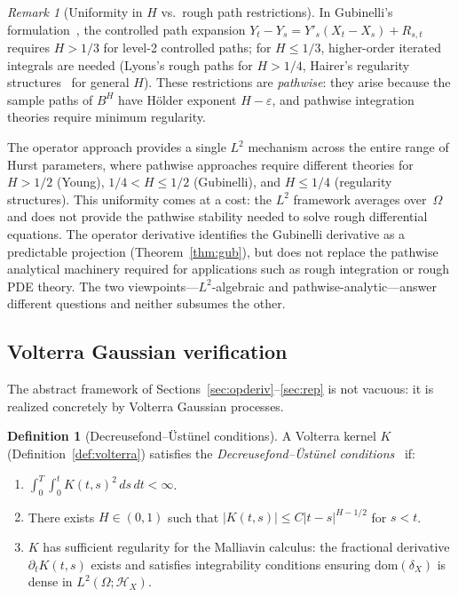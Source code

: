 \documentclass[11pt,a4paper]{article}
\theoremstyle{plain}
\theoremstyle{definition}
\newtheorem{definition}[theorem]{Definition}
\theoremstyle{remark}
\newtheorem{remark}[theorem]{Remark}
\newcommand{\dom}{\mathrm{dom}}
\newcommand{\HX}{\mathcal{H}_X}
\newcommand{\BH}{B^H}
\begin{document}
\begin{remark}[Uniformity in $H$ vs.\ rough path restrictions]\label{rem:gub_scalar}
In Gubinelli's formulation~\cite{Gubinelli2004}, the controlled path expansion $Y_t-Y_s = Y'_s(X_t-X_s)+R_{s,t}$ requires $H > 1/3$ for level-2 controlled paths; for $H \le 1/3$, higher-order iterated integrals are needed (Lyons's rough paths for $H > 1/4$, Hairer's regularity structures~\cite{Hairer2014} for general $H$). These restrictions are \emph{pathwise}: they arise because the sample paths of $\BH$ have H\"older exponent $H-\varepsilon$, and pathwise integration theories require minimum regularity.

The operator approach provides a single $L^2$ mechanism across the entire range of Hurst parameters, where pathwise approaches require different theories for $H > 1/2$ (Young), $1/4 < H \le 1/2$ (Gubinelli), and $H \le 1/4$ (regularity structures). This uniformity comes at a cost: the $L^2$ framework averages over~$\Omega$ and does not provide the pathwise stability needed to solve rough differential equations. The operator derivative identifies the Gubinelli derivative as a predictable projection (Theorem~\ref{thm:gub}), but does not replace the pathwise analytical machinery required for applications such as rough integration or rough PDE theory. The two viewpoints---$L^2$-algebraic and pathwise-analytic---answer different questions and neither subsumes the other.
\end{remark}


\subsection{Volterra Gaussian verification}\label{ssec:volterra_verif}

The abstract framework of Sections~\ref{sec:opderiv}--\ref{sec:rep} is not vacuous: it is realized concretely by Volterra Gaussian processes.

\begin{definition}[Decreusefond--\"Ust\"unel conditions]\label{def:DU}
A Volterra kernel $K$ (Definition~\ref{def:volterra}) satisfies the \emph{Decreusefond--\"Ust\"unel conditions}~\cite{Decreusefond1999} if:
\begin{enumerate}[label=\textup{(\roman*)}]
\item $\int_0^T\int_0^t K(t,s)^2\,ds\,dt < \infty$.
\item There exists $H \in (0,1)$ such that $|K(t,s)| \le C|t-s|^{H-1/2}$ for $s < t$.
\item $K$ has sufficient regularity for the Malliavin calculus: the fractional derivative $\partial_t K(t,s)$ exists and satisfies integrability conditions ensuring $\dom(\delta_X)$ is dense in $L^2(\Omega;\HX)$.
\end{enumerate}
\end{definition}
\end{document}
